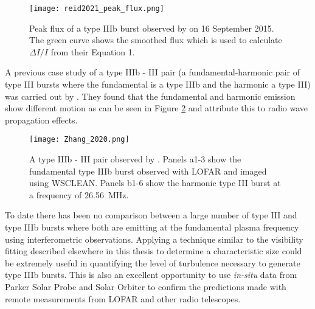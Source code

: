 \begin{figure}[ht]
\centering
\texttt{[image: reid2021\_peak\_flux.png]}
\caption[Peak flux of a type IIIb burst observed by \cite{Reid2021}.]{Peak flux of a type IIIb burst observed by \cite{Reid2021} on 16 September 2015. The green curve shows the smoothed flux which is used to calculate $\Delta I/I$ from their Equation 1.}
\label{fig:reid_peakflux}
\end{figure}

A previous case study of a type IIIb - III pair (a fundamental-harmonic pair of type III bursts where the fundamental is a type IIIb and the harmonic a type III) was carried out by \cite{Zhang2020}. They found that the fundamental and harmonic emission show different motion as can be seen in Figure \ref{fig:typeIIIbIII} and attribute this to radio wave propagation effects.

\begin{figure}[ht]
\centering
\texttt{[image: Zhang\_2020.png]}
\caption[Type IIIb - III pair observed by \cite{Zhang2020}.]{A type IIIb - III pair observed by \cite{Zhang2020}. Panels a1-3 show the fundamental type IIIb burst observed with LOFAR and imaged using WSCLEAN. Panels b1-6 show the harmonic type III burst at a frequency of 26.56~MHz.}
\label{fig:typeIIIbIII}
\end{figure}

To date there has been no comparison between a large number of type III and type IIIb bursts where both are emitting at the fundamental plasma frequency using interferometric observations. Applying a technique similar to the visibility fitting described elsewhere in this thesis to determine a characteristic size could be extremely useful in quantifying the level of turbulence necessary to generate type IIIb bursts. This is also an excellent opportunity to use \textit{in-situ} data from Parker Solar Probe \citep[PSP;][]{Fox2016} and Solar Orbiter \citep{Muller2020} to confirm the predictions made with remote measurements from LOFAR and other radio telescopes. 


